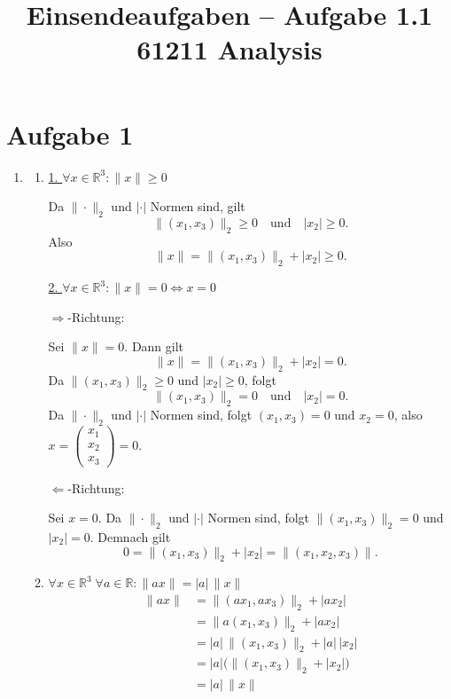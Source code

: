 \documentclass[a4paper,12pt]{article}
\title{Einsendeaufgaben -- Aufgabe 1.1\\[0.5em]
\large 61211 Analysis}
\author{}
\date{}
\begin{document}
\maketitle

\section*{Aufgabe 1}

\begin{enumerate}[label=\alph*)]

    \item
    \begin{enumerate}[label=(\roman*)]

        \item
        \underline{1. $\forall x \in \mathbb{R}^3 : \|x\| \geq 0$}

        Da $\|\cdot\|_2$ und $|\cdot|$ Normen sind, gilt
        \[
            \|(x_1, x_3)\|_2 \geq 0 \quad \text{und} \quad |x_2| \geq 0.
        \]
        Also
        \[
            \|x\| = \|(x_1, x_3)\|_2 + |x_2| \geq 0.
        \]

        \underline{2. $\forall x \in \mathbb{R}^3 : \|x\| = 0 \Longleftrightarrow x = 0$}

        \glqq$\Rightarrow$\grqq-Richtung:

        Sei $\|x\| = 0$. Dann gilt
        \[
            \|x\| = \|(x_1, x_3)\|_2 + |x_2| = 0.
        \]
        Da $\|(x_1, x_3)\|_2 \geq 0$ und $|x_2| \geq 0$, folgt
        \[
            \|(x_1, x_3)\|_2 = 0 \quad \text{und} \quad |x_2| = 0.
        \]
        Da $\|\cdot\|_2$ und $|\cdot|$ Normen sind, folgt
        $(x_1, x_3) = 0$ und $x_2 = 0$,
        also $x = \begin{pmatrix}x_1\\x_2\\x_3\end{pmatrix} = 0$.

        \glqq$\Leftarrow$\grqq-Richtung:

        Sei $x = 0$. Da $\|\cdot\|_2$ und $|\cdot|$ Normen sind, folgt
        $\|(x_1, x_3)\|_2 = 0$ und $|x_2| = 0$. Demnach gilt
        \[
            0 = \|(x_1, x_3)\|_2 + |x_2| = \|(x_1, x_2, x_3)\|.
        \]

        \item
        $\forall x \in \mathbb{R}^3\; \forall a \in \mathbb{R} : \|ax\| = |a|\,\|x\|$
        \begin{align*}
            \|ax\| &= \|(ax_1, ax_3)\|_2 + |ax_2| \\
                   &= \|a(x_1, x_3)\|_2 + |ax_2| \\
                   &= |a|\,\|(x_1, x_3)\|_2 + |a|\,|x_2| \\
                   &= |a|\bigl(\|(x_1, x_3)\|_2 + |x_2|\bigr) \\
                   &= |a|\,\|x\|
        \end{align*}


\end{enumerate}
\end{enumerate}
\end{document}
